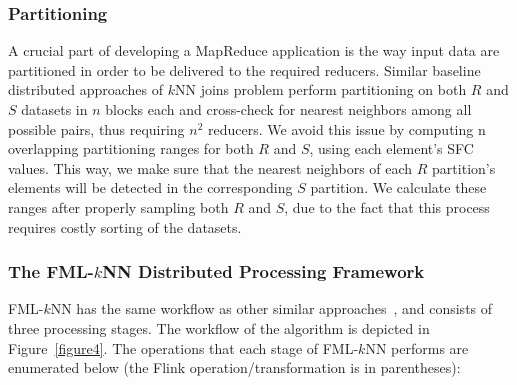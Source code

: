 \subsubsection{Partitioning}
A crucial part of developing a MapReduce application is the way input data are partitioned in order to be delivered to the required reducers. Similar baseline distributed approaches of $k$NN joins problem perform partitioning on both $R$ and $S$ datasets in $n$ blocks each and cross-check for nearest neighbors among all possible pairs, thus requiring $n^2$ reducers. We avoid this issue by computing n overlapping partitioning ranges for both $R$ and $S$, using each element’s SFC values. This way, we make sure that the nearest neighbors of each $R$ partition’s elements will be detected in the corresponding $S$ partition. We calculate these ranges after properly sampling both $R$ and $S$, due to the fact that this process requires costly sorting of the datasets.

\subsubsection{The FML-$k$NN Distributed Processing Framework}
FML-$k$NN has the same workflow as other similar approaches~\cite{song2015hal}, and consists of three processing stages. The workflow of the algorithm is depicted in Figure~\ref{figure4}. The operations that each stage of FML-$k$NN performs are enumerated below (the Flink operation/transformation is in parentheses):

